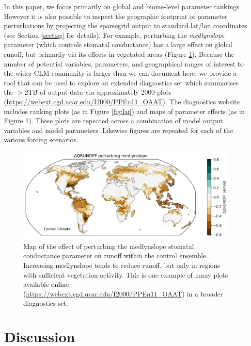 \documentclass[draft]{agujournal2019}
\begin{document}
In this paper, we focus primarily on global and biome-level parameter rankings. However it is also possible to inspect the geographic footprint of parameter perturbations by projecting the sparsegrid output to standard lat/lon coordinates (see Section \ref{sect:sg} for details). For example, perturbing the \textit{medlynslope} parameter (which controls stomatal conductance) has a large effect on global runoff, but primarily via its effects in vegetated areas (Figure \ref{fig:map}). 
Because the number of potential variables, parameters, and geographical ranges of interest to the wider CLM community is larger than we can document here,  we provide a tool that can be used to explore an extended diagnostics set which summarises the $>$2TB of output data via approximately 2000 plots (\url{https://webext.cgd.ucar.edu/I2000/PPEn11_OAAT}). The diagnostics website includes ranking plots (as in Figure \ref{fig:lai}) and maps of parameter effects (as in Figure \ref{fig:map}). These plots are repeated across a combination of model output variables and model parameters. Likewise figures are repeated for each of the various forcing scenarios. 




\begin{figure}[h]
\centering
\includegraphics[width=\textwidth]{../figs/QRUNOFFabs_x_medlynslope_CTL2010.png}
\caption{Map of the effect of perturbing the medlynslope stomatal conductance parameter on runoff within the control ensemble. Increasing medlynslope tends to reduce runoff, but only in regions with sufficient vegetation activity. This is one example of many plots available online (\url{https://webext.cgd.ucar.edu/I2000/PPEn11_OAAT}) in a broader diagnostics set. }
\label{fig:map}
\end{figure}

\section{Discussion}
\end{document}
